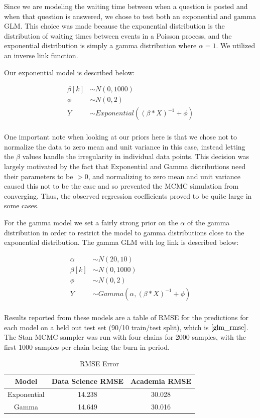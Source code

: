 \documentclass[12pt]{article}
\begin{document}
Since we are modeling the waiting time between when a question is posted and when that question is answered, we chose to test both an exponential and gamma GLM. This choice was made because the exponential distribution is the distribution of waiting times between events in a Poisson process, and the exponential distribution is simply a gamma distribution where $\alpha = 1$. We utilized an inverse link function. 

Our exponential model is described below:

\begin{align*}
\beta[k] & \sim N(0,1000)\\
\phi & \sim N(0,2) \\
Y & \sim Exponential((\beta * X)^{-1} + \phi)\\
\end{align*}

One important note when looking at our priors here is that we chose not to normalize the data to zero mean and unit variance in this case, instead letting the $\beta$ values handle the irregularity in individual data points. This decision was largely motivated by the fact that Exponential and Gamma distributions need their parameters to be $> 0$, and normalizing to zero mean and unit variance caused this not to be the case and so prevented the MCMC simulation from converging. Thus, the observed regression coefficients proved to be quite large in some cases. 

For the gamma model we set a fairly strong prior on the $\alpha$ of the gamma distribution in order to restrict the model to gamma distributions close to the exponential distribution. The gamma GLM with log link is described below:

\begin{align*}
\alpha & \sim N(20,10) \\
\beta[k] & \sim N(0,1000)\\
\phi & \sim N(0,2) \\
Y & \sim Gamma(\alpha, (\beta * X)^{-1} + \phi)\\
\end{align*}

Results reported from these models are a table of RMSE for the predictions for each model on a held out test set (90/10 train/test split), which is $\ref{glm_rmse}$. The Stan MCMC sampler was run with four chains for 2000 samples, with the first 1000 samples per chain being the burn-in period.

\begin{table}[ht]
  \centering
  \begin{tabular}{|c|c|c|}\hline
    Model & Data Science RMSE & Academia RMSE   \\ \hline
    Exponential & 14.238 & 30.028 \\
    Gamma & 14.649 & 30.016 \\ \hline
  \end{tabular}
  \caption{RMSE Error}
  \label{glm_rmse}
\end{table}
\end{document}
